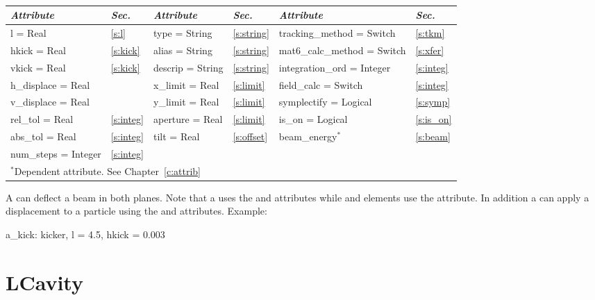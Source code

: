{{\begin{center}
\tt
\begin{tabular}{|l|l||l|l||l|l|} \hline
  {\sl Attribute} & {\sl Sec.} & {\sl Attribute} & {\sl Sec.} &  {\sl Attribute} & {\sl Sec.} \\ \hline
  l        = Real       & \ref{s:l}       & type = String      & \ref{s:string} & tracking\_method = Switch    & \ref{s:tkm}   \\ \hline
  hkick    = Real       & \ref{s:kick}    & alias = String     & \ref{s:string} & mat6\_calc\_method = Switch  & \ref{s:xfer}  \\ \hline
  vkick    = Real       & \ref{s:kick}    & descrip = String   & \ref{s:string} & integration\_ord = Integer   & \ref{s:integ} \\ \hline
  h\_displace = Real    &                 & x\_limit = Real    & \ref{s:limit}  & field\_calc = Switch         & \ref{s:integ} \\ \hline 
  v\_displace = Real    &                 & y\_limit = Real    & \ref{s:limit}  & symplectify = Logical        & \ref{s:symp}  \\ \hline
  rel\_tol = Real       & \ref{s:integ}   & aperture = Real    & \ref{s:limit}  & is\_on = Logical             & \ref{s:is_on} \\ \hline
  abs\_tol = Real       & \ref{s:integ}   & tilt     = Real    & \ref{s:offset} & beam\_energy$^*$             & \ref{s:beam}  \\ \hline
  num\_steps = Integer  & \ref{s:integ}   &                    &                &                              &               \\ \hline
  \multicolumn{6}{l}{\small $^*$Dependent attribute. See Chapter~\ref{c:attrib}} \\
\end{tabular}
\end{center}
\toffset

A  can deflect a beam in both planes. Note that a
 uses the  and  attributes while
 and  elements use the  attribute. 
In addition a  can apply a displacement to a particle
using the  and  attributes.
Example:
\begin{example}
  a_kick: kicker, l = 4.5, hkick = 0.003
\end{example}

\section{LCavity}
\label{s:lcav}

}}
